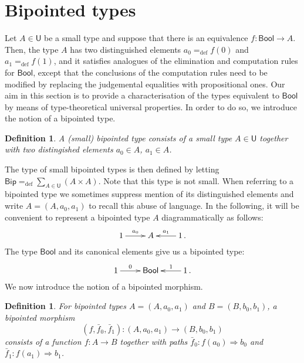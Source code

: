 \documentclass[10pt,a4paper,oneside,reqno]{amsart}
\numberwithin{equation}{section}
\theoremstyle{mythm}
\theoremstyle{mydef}
\newtheorem{definition}[theorem]{Definition}
\theoremstyle{myrmk}
\newcommand{\defeq}{=_{\mathrm{def}}}
\newcommand{\co}{\colon}
\newcommand{\Bool}{\mathsf{Bool}}
\newcommand{\UU}{\mathsf{U}}
\newcommand{\Bip}{\mathsf{Bip}}
\begin{document}
\newpage

\section{Bipointed types}
\label{sec:bip}



Let $A \in \UU$ be a small type and suppose that there is an equivalence $f \co \Bool \to A$. Then, the type $A$ 
has two distinguished elements $a_0 \defeq f(0)$ and $a_1 \defeq f(1)$, and it satisfies
analogues of the elimination and computation rules for $\Bool$, except that the conclusions of the computation 
rules need to be modified  by replacing the judgemental equalities  with propositional ones. Our aim in this section is to provide a characterisation of the types equivalent to $\Bool$ by means of type-theoretical universal properties. In order to do so, we introduce the notion of a bipointed type. 


\begin{definition} \label{thm:bipointedtype}
A  (small) \emph{bipointed type} consists of a small type $A \in \UU$ together with two distingished elements 
$a_0 \in A$, $a_1 \in A$.
\end{definition}

The type of small bipointed types is then defined by letting $\Bip \defeq \sum_ {A \in \UU}( A \times A )$. 
Note that this type is not small.
When referring to a bipointed type we sometimes suppress mention of its distinguished elements and write $A = (A, a_0, a_1)$ to
recall this abuse of language.  In the following, it will be convenient to represent a bipointed type $A$ diagrammatically as follows:
\[
\xymatrix{
 1 \ar[r]^-{a_0}&  A & 1 \ar[l]_-{a_1} \, .}
 \]
The type $\Bool$ and its canonical elements give us a bipointed type:
\[
\xymatrix{
 1 \ar[r]^-{0}&  \Bool  & 1 \ar[l]_-{1} \, . }
 \]
We now introduce the notion of a bipointed morphism.

\begin{definition} For bipointed types $A = (A, a_0, a_1)$ and $B = (B, b_0, b_1)$, a \emph{bipointed morphism} 
\[
(f, \bar{f}_0, \bar{f}_1)  \co (A, a_0, a_1)  \to (B, b_0, b_1)
\] 
consists of a function $f \co A \to B$ together with paths $\bar{f}_0 \co  f(a_0) \Rightarrow b_0$ 
and~$\bar{f}_1 \co f(a_1) \Rightarrow b_1$.  \end{definition}
\end{document}
